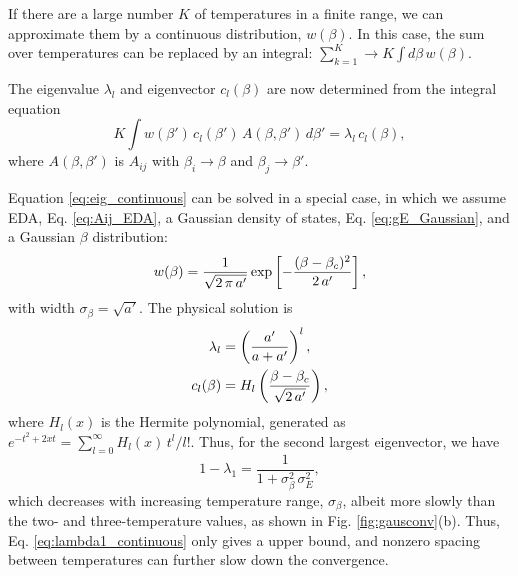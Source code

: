 \documentclass[aip,jcp,preprint,superscriptaddress]{revtex4-1}
\begin{document}
If there are a large number $K$ of temperatures
in a finite range,
{we can approximate them}
by a continuous distribution, $w(\beta)$.
%
In this case,
the sum over temperatures can be
replaced by an integral:
%
$
\sum_{k = 1}^K
\rightarrow
K \int d\beta \, w(\beta).
$

The eigenvalue $\lambda_l$
and eigenvector $c_l(\beta)$
are now determined from the integral equation
%
\begin{equation}
K \int w(\beta') \, c_l(\beta') \, A(\beta, \beta') \, d\beta'
= \lambda_l \, c_l(\beta),
\label{eq:eig_continuous}
\end{equation}
%
where
$A(\beta, \beta')$
is $A_{ij}$
with 
{$\beta_i \rightarrow \beta$ and $\beta_j \rightarrow \beta'$.}



Equation \eqref{eq:eig_continuous}
can be solved in a special case, in which
we assume EDA, Eq. \eqref{eq:Aij_EDA},
a Gaussian density of states,
Eq. \eqref{eq:gE_Gaussian},
and
a Gaussian $\beta$ distribution:
%
\begin{align}
w(\beta)
=
\frac{1}{\sqrt{2 \, \pi \, a'}}
\exp\left[
  -\frac{ (\beta - \beta_c)^2 }{ 2 \, a' }
\right],
\notag
\end{align}
%
with width $\sigma_\beta = \sqrt{a'}$.
%
%
%
The physical solution is
%
\begin{align}
\lambda_l
&=
\left(
  \frac { a' } { a + a' }
\right)^l,
\notag
\\
c_l(\beta)
&=
H_l\left(
  \frac{ \beta - \beta_c }
  { \sqrt{ 2 \, a' } }
\right),
\notag
\end{align}
%
where
$H_l(x)$
is the Hermite polynomial\cite{
arfken, *abramowitz, *wang_specfunc},
generated as
$e^{-t^2 + 2x t} = \sum_{l = 0}^\infty H_l(x) \, t^l/l!$.
%
Thus, for the second largest eigenvector,
we have
%
\begin{equation}
1 - \lambda_1
=
\frac{1}
{ 1 + \sigma_\beta^2 \, \sigma_E^2},
\label{eq:lambda1_continuous}
\end{equation}
%
which decreases
with increasing temperature range,
$\sigma_\beta$,
albeit more slowly than
the two- and three-temperature values,
as shown in Fig. \ref{fig:gausconv}(b).
%
Thus,
Eq. \eqref{eq:lambda1_continuous}
only gives a upper bound,
and nonzero spacing between temperatures
can further slow down the convergence.




\end{document}

